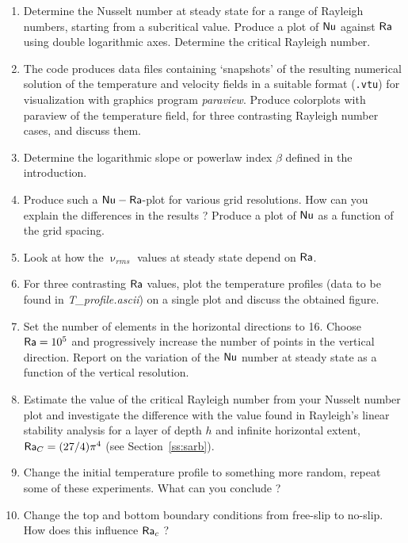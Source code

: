 \begin{enumerate}
\item Determine the Nusselt number at steady state for a range of Rayleigh numbers, 
starting from a subcritical value. 
Produce a plot of ${\mathsf{Nu}}$ against ${\mathsf{Ra}}$ using double logarithmic axes. 
Determine the critical Rayleigh number. 

\item The code produces data files containing `snapshots' of the resulting numerical solution 
of the temperature and velocity fields in a suitable format ({\tt .vtu}) for visualization with 
graphics program {\sl paraview}. 
Produce colorplots with paraview of the temperature field, for three contrasting Rayleigh number cases, 
and discuss them.

\item Determine the logarithmic slope or powerlaw index $\beta$ defined in the introduction.

\item Produce such a ${\mathsf{Nu}}-{\mathsf{Ra}}$-plot for various grid resolutions. 
How can you explain the differences in 
the results ? Produce a plot of ${\mathsf{Nu}}$ as a function of the grid spacing. 

\item Look at how the $\upnu_{rms}$ values at steady state depend on ${\mathsf{Ra}}$. 

\item For three contrasting ${\mathsf{Ra}}$ values, plot the temperature profiles 
(data to be found in {\sl T\_profile.ascii}) on a single plot and discuss the obtained figure.

\item Set the number of elements in the horizontal directions to 16. Choose ${\mathsf{Ra}}=10^5$ 
and progressively increase the number 
of points in the vertical direction. Report on the variation of the ${\mathsf{Nu}}$ number at steady 
state as a function of the vertical resolution.

\item Estimate the value of the critical Rayleigh number from your Nusselt number plot and 
investigate the difference with the value found in Rayleigh's linear stability analysis 
for a layer of depth $h$ and infinite horizontal extent, ${\mathsf{Ra}}_C = (27/4)  \pi^4$ 
(see Section~\ref{ss:sarb}).

\item Change the initial temperature profile to something more random, repeat some of these experiments. 
What can you conclude ?

\item Change the top and bottom boundary conditions from free-slip to no-slip. How 
does this influence ${\mathsf{Ra}}_c$ ?


\end{enumerate}
